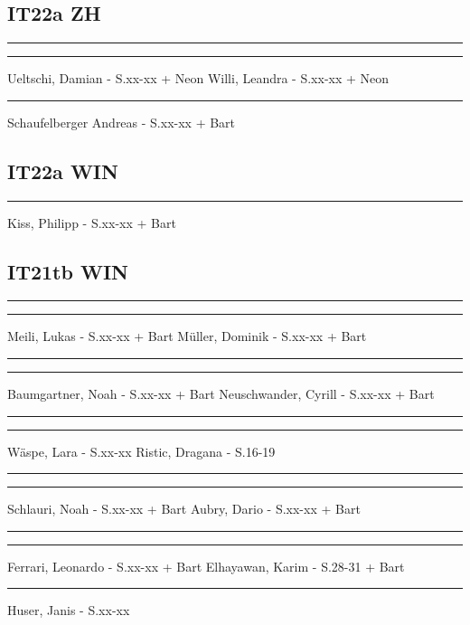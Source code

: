 \documentclass[fontsize=12pt,parskip=half]{scrartcl}
\begin{document}
\subsection*{IT22a ZH}
\vspace{50pt}
\noindent\rule{7cm}{.4pt}\hfill\rule{7cm}{.4pt}\par
\noindent Ueltschi, Damian - S.xx-xx + Neon \hfill Willi, Leandra - S.xx-xx + Neon

\vspace{50pt}
\noindent\rule{7cm}{.4pt}\hfill\par
\noindent Schaufelberger Andreas - S.xx-xx + Bart\hfill

\subsection*{IT22a WIN}
\vspace{50pt}
\noindent\rule{7cm}{.4pt}\hfill\par
\noindent Kiss, Philipp - S.xx-xx + Bart \hfill

\subsection*{IT21tb WIN}
\vspace{50pt}
\noindent\rule{7cm}{.4pt}\hfill\rule{7cm}{.4pt}\par
\noindent Meili, Lukas - S.xx-xx + Bart \hfill Müller, Dominik - S.xx-xx + Bart

\vspace{50pt}
\noindent\rule{7cm}{.4pt}\hfill\rule{7cm}{.4pt}\par
\noindent Baumgartner, Noah - S.xx-xx + Bart \hfill Neuschwander, Cyrill - S.xx-xx + Bart

\vspace{50pt}
\noindent\rule{7cm}{.4pt}\hfill\rule{7cm}{.4pt}\par
\noindent Wäspe, Lara - S.xx-xx \hfill Ristic, Dragana - S.16-19

\vspace{50pt}
\noindent\rule{7cm}{.4pt}\hfill\rule{7cm}{.4pt}\par
\noindent Schlauri, Noah - S.xx-xx + Bart \hfill Aubry, Dario - S.xx-xx + Bart

\vspace{50pt}
\noindent\rule{7cm}{.4pt}\hfill\rule{7cm}{.4pt}\par
\noindent Ferrari, Leonardo - S.xx-xx + Bart \hfill Elhayawan, Karim - S.28-31 + Bart

\vspace{50pt}
\noindent\rule{7cm}{.4pt}\par
\noindent Huser, Janis - S.xx-xx\hfill
\end{document}
